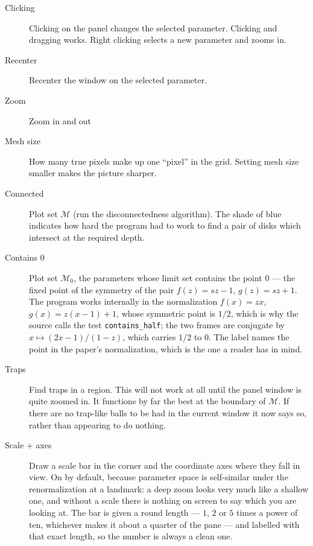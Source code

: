 \documentclass{amsart}
\begin{document}
\begin{description}
\item[Clicking] Clicking on the panel changes the selected parameter.  
Clicking and dragging works.  Right clicking selects a new parameter and zooms in.
\item[Recenter] Recenter the window on the selected parameter.
\item[Zoom] Zoom in and out
\item[Mesh size] How many true pixels make up one ``pixel'' in the grid.  
Setting mesh size smaller makes the picture sharper.
\item[Connected] Plot set $\mathcal{M}$ (run the disconnectedness algorithm).
The shade of blue indicates how hard the program had to work to find a pair of 
disks which intersect at the required depth.
\item[Contains $0$] Plot set $\mathcal{M}_0$, the parameters whose limit set contains the
point $0$ --- the fixed point of the symmetry of the pair $f(z) = sz-1$, $g(z) = sz+1$.  The
program works internally in the normalization $f(x) = zx$, $g(x) = z(x-1)+1$, whose symmetric
point is $1/2$, which is why the source calls the test \texttt{contains\_half}; the two frames
are conjugate by $x \mapsto (2x-1)/(1-z)$, which carries $1/2$ to $0$.  The label names the
point in the paper's normalization, which is the one a reader has in mind.
\item[Traps] Find traps in a region.  This will not work at all until the
panel window is quite zoomed in.  It functions by far the best at the boundary of $\mathcal{M}$.
If there are no trap-like balls to be had in the current window it now says so, rather than
appearing to do nothing.
\item[Scale + axes] Draw a scale bar in the corner and the coordinate axes where they fall
in view.  On by default, because parameter space is self-similar under the renormalization
at a landmark: a deep zoom looks very much like a shallow one, and without a scale there is
nothing on screen to say which you are looking at.  The bar is given a round length --- $1$,
$2$ or $5$ times a power of ten, whichever makes it about a quarter of the pane --- and
labelled with that exact length, so the number is always a clean one.


\end{description}
\end{document}
